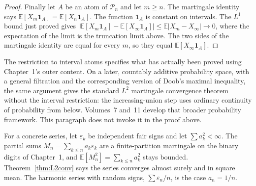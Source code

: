 \begin{proof}
Finally let $A$ be an atom of $\mathcal P_n$ and let $m\ge n$. The martingale identity says $\mathbb E[X_m\mathbf 1_A]=\mathbb E[X_n\mathbf 1_A]$. The function $\mathbf 1_A$ is constant on intervals. The $L^1$ bound just proved gives $|\mathbb E[X_m\mathbf 1_A]-\mathbb E[X_\infty\mathbf 1_A]|\le\mathbb E|X_m-X_\infty|\to0$, where the expectation of the limit is the truncation limit above. The two sides of the martingale identity are equal for every $m$, so they equal $\mathbb E[X_\infty\mathbf 1_A]$.
\end{proof}

The restriction to interval atoms specifies what has actually been proved using Chapter~1's outer content. On a later, countably additive probability space, with a general filtration and the corresponding version of Doob's maximal inequality, the same argument gives the standard $L^2$ martingale convergence theorem without the interval restriction: the increasing-union step uses ordinary continuity of probability from below. Volumes~7 and~11 develop that broader probability framework. This paragraph does not invoke it in the proof above.

For a concrete series, let $\varepsilon_k$ be independent fair signs and let $\sum a_k^2<\infty$. The partial sums $M_n=\sum_{k\le n}a_k\varepsilon_k$ are a finite-partition martingale on the binary digits of Chapter~1, and $\mathbb E[M_n^2]=\sum_{k\le n}a_k^2$ stays bounded. Theorem~\ref{thm:L2conv} says the series converges almost surely and in square mean. The harmonic series with random signs, $\sum\varepsilon_n/n$, is the case $a_n=1/n$.

